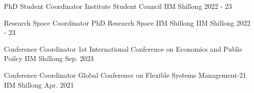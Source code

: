 


\begin{cvhonors}


\cvhonor
{PhD Student Coordinator} %
{Institute Student Council} %
{IIM Shillong} %
{2022 - 23} %

    

\cvhonor
{Research Space Coordinator} %
{PhD Research Space IIM Shillong} %
{IIM Shillong} %
{2022 - 23} %

\cvhonor
{Conference Coordinator} %
{1st International Conference on Economics and Public Poilcy} %
{IIM Shillong} %
{Sep. 2023} %

\cvhonor
{Conference Coordinator} %
{Global Conference on Flexible Systems Management-21} %
{IIM Shillong} %
{Apr. 2021} %



\end{cvhonors}